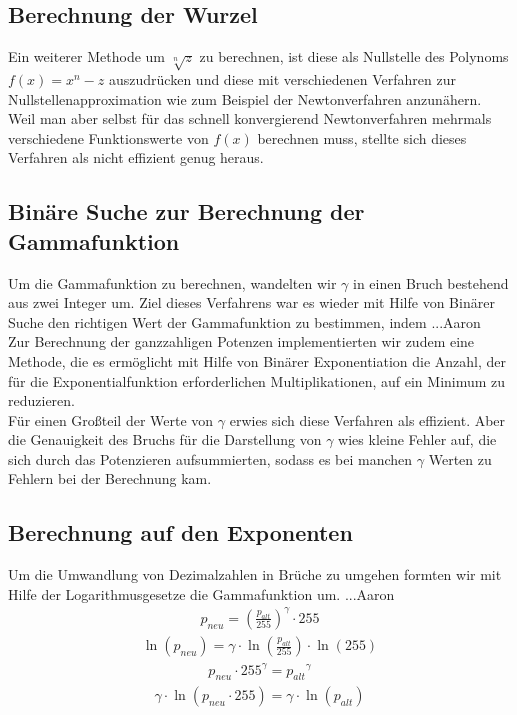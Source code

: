 \documentclass[course=erap]{aspdoc}
\begin{document}
\subsection{Berechnung der Wurzel}
Ein weiterer Methode um $\sqrt[n]{z}$ zu berechnen, ist diese als Nullstelle des Polynoms $f(x)=x^n-z$ auszudrücken und diese mit verschiedenen Verfahren zur Nullstellenapproximation wie zum Beispiel der Newtonverfahren anzunähern. Weil man aber selbst für das schnell konvergierend Newtonverfahren mehrmals verschiedene Funktionswerte von $f(x)$ berechnen muss, stellte sich dieses Verfahren als nicht effizient genug heraus.     

\subsection{Binäre Suche zur Berechnung der Gammafunktion}
Um die Gammafunktion zu berechnen, wandelten wir  $\gamma$ in einen Bruch bestehend aus zwei Integer um. Ziel dieses Verfahrens war es wieder mit Hilfe von Binärer Suche den richtigen Wert der Gammafunktion zu bestimmen, indem ...Aaron
\\
\newline
\noindent	
Zur Berechnung der ganzzahligen Potenzen implementierten wir zudem eine Methode, die es ermöglicht mit Hilfe von Binärer Exponentiation die Anzahl, der für die Exponentialfunktion erforderlichen Multiplikationen, auf ein Minimum zu reduzieren. 
\\
\newline
\noindent		 
Für einen Großteil der Werte von $\gamma$ erwies sich diese Verfahren als effizient. Aber die Genauigkeit des Bruchs für die Darstellung von $\gamma$ wies kleine Fehler auf, die sich durch das Potenzieren aufsummierten, sodass es bei manchen $\gamma$ Werten zu Fehlern bei der Berechnung kam.       

\subsection{Berechnung auf den Exponenten}
Um die Umwandlung von Dezimalzahlen in Brüche zu umgehen formten wir mit Hilfe der Logarithmusgesetze die Gammafunktion um. ...Aaron
\begin{align}	
p_{neu} = \left(\frac{p_{alt}}{255}\right)^{\gamma} \cdot 255
\end{align}
\begin{align}	
\ln (p_{neu}) = \gamma \cdot \ln\left(\frac{p_{alt}}{255}\right) \cdot \ln(255)
\end{align}
\begin{align}
p_{neu} \cdot 255^\gamma = {p_{alt}}^{\gamma}
\end{align}
\begin{align}
\gamma \cdot \ln ( p_{neu} \cdot 255) = \gamma \cdot \ln({p_{alt}})
\end{align}
\end{document}
